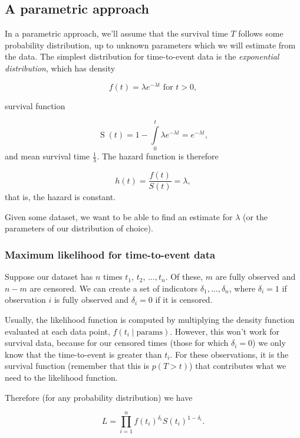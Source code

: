 \documentclass[
  openany]{book}
\theoremstyle{definition}
\theoremstyle{definition}
\theoremstyle{definition}
\theoremstyle{definition}
\theoremstyle{remark}
\begin{document}
\subsection{A parametric approach}\label{a-parametric-approach}

In a parametric approach, we'll assume that the survival time \(T\) follows some probability distribution, up to unknown parameters which we will estimate from the data. The simplest distribution for time-to-event data is the \emph{exponential distribution}, which has density

\[f\left(t\right) = \lambda e^{-\lambda t} \text{ for }t>0,\]

survival function

\[\operatorname{S}\left(t\right) = 1- \int\limits_{0}^t{\lambda e^{-\lambda t}} = e^{-\lambda t}, \]
and mean survival time \(\frac{1}{\lambda}\). The hazard function is therefore

\[h\left(t\right) = \frac{f\left(t\right)}{S\left(t\right)} = \lambda, \]
that is, the hazard is constant.

Given some dataset, we want to be able to find an estimate for \(\lambda\) (or the parameters of our distribution of choice).

\subsubsection{Maximum likelihood for time-to-event data}\label{expll}

Suppose our dataset has \(n\) times \(t_1,\,t_2,\,\ldots,t_n\). Of these, \(m\) are fully observed and \(n-m\) are censored. We can create a set of indicators \(\delta_1,\ldots,\delta_n\), where \(\delta_i=1\) if observation \(i\) is fully observed and \(\delta_i=0\) if it is censored.

Usually, the likelihood function is computed by multiplying the density function evaluated at each data point, \(f\left(t_i\mid{\text{params}}\right)\). However, this won't work for survival data, because for our censored times (those for which \(\delta_i=0\)) we only know that the time-to-event is greater than \(t_i\). For these observations, it is the survival function (remember that this is \(p\left(T>t\right)\)) that contributes what we need to the likelihood function.

Therefore (for any probability distribution) we have

\begin{equation}
L = \prod\limits_{i=1}^n f\left(t_i\right)^{\delta_i} S\left(t_i\right)^{1-\delta_i}.
\label{eq:lfunsurv}
\end{equation}
\end{document}
